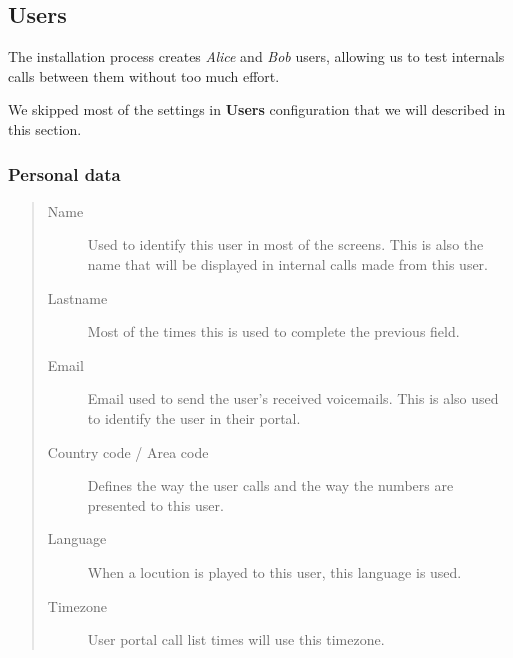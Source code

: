 \documentclass[letterpaper,10pt,spanish]{sphinxmanual}
\begin{document}
\subsection{Users}
\label{administration_portal/client/vpbx/users::doc}\label{administration_portal/client/vpbx/users:users}\label{administration_portal/client/vpbx/users:id1}
The installation process creates \emph{Alice} and \emph{Bob} users, allowing us
to test internals calls between them without too much effort.

We skipped most of the settings in \textbf{Users} configuration that we will described
in this section.


\subsubsection{Personal data}
\label{administration_portal/client/vpbx/users:personal-data}\begin{quote}
\begin{description}
\item[{Name}] \leavevmode
Used to identify this user in most of the screens. This is also the
name that will be displayed in internal calls made from this user.

\item[{Lastname}] \leavevmode
Most of the times this is used to complete the previous field.

\item[{Email}] \leavevmode
Email used to send the user's received voicemails. This is also used to
identify the user in their portal.

\item[{Country code / Area code}] \leavevmode
Defines the way the user calls and the way the numbers are presented to
this user.

\item[{Language}] \leavevmode
When a locution is played to this user, this language is used.

\item[{Timezone}] \leavevmode
User portal call list times will use this timezone.

\end{description}
\end{quote}
\end{document}
